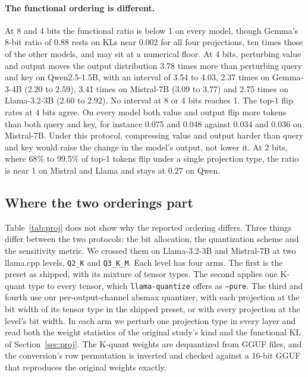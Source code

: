 \documentclass[journal]{IEEEtran}
\begin{document}
\paragraph{The functional ordering is different.} At 8 and 4 bits the functional ratio is below
1 on every model, though Gemma's 8-bit ratio of 0.88 rests on KLs near $0.002$ for all four
projections, ten times those of the other models, and may sit at a numerical floor. At 4 bits, perturbing value and output moves the output distribution 3.78
times more than perturbing query and key on Qwen2.5-1.5B, with an interval of 3.54 to 4.03,
2.37 times on Gemma-3-4B (2.20 to 2.59), 3.41 times on Mistral-7B (3.09 to 3.77) and 2.75 times
on Llama-3.2-3B (2.60 to 2.92). No interval at 8 or 4 bits reaches 1. The top-1 flip rates at 4 bits agree. On every
model both value and output flip more tokens than both query and key, for instance 0.075 and
0.048 against 0.034 and 0.036 on Mistral-7B. Under this protocol, compressing value and output
harder than query and key would raise the change in the model's output, not lower it. At 2 bits,
where 68\% to 99.5\% of top-1 tokens flip under a single projection type, the ratio is near 1 on
Mistral and Llama and stays at 0.27 on Qwen.

\subsection{Where the two orderings part}\label{sec:proj:factorial}

Table~\ref{tab:proj} does not show why the reported ordering differs. Three things differ
between the two protocols: the bit allocation, the quantization scheme and the sensitivity
metric. We crossed them on Llama-3.2-3B and Mistral-7B at two llama.cpp levels, \texttt{Q2\_K}
and \texttt{Q3\_K\_M}. Each level has four arms. The first is the preset as shipped, with its
mixture of tensor types. The second applies one K-quant type to every tensor, which
\texttt{llama-quantize} offers as \texttt{--pure}. The third and fourth use our per-output-channel
absmax quantizer, with each projection at the bit width of its tensor type in the shipped preset,
or with every projection at the level's bit width. In each arm we perturb one projection type in
every layer and read both the weight statistics of the original study's kind and the functional
KL of Section~\ref{sec:proj}. The K-quant weights are dequantized from GGUF files, and the
conversion's row permutation is inverted and checked against a 16-bit GGUF that reproduces the
original weights exactly.
\end{document}
